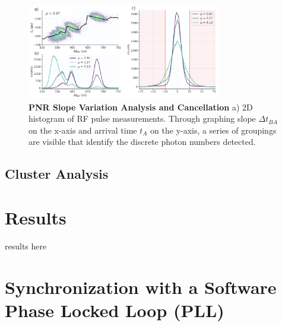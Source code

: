 \documentclass[11pt]{caltech_thesis} %
\begin{document}
\hypertarget{fig:slope-correction}{%
\begin{figure}
\centering
\includegraphics[width=0.75\textwidth,height=\textheight]{chapter_03/figs_03/slope_cancellation_light.pdf}
\caption[{PNR Slope Variation Analysis and Cancellation}]{\textbf{PNR
Slope Variation Analysis and Cancellation} a) 2D histogram of RF pulse
measurements. Through graphing slope \(\Delta t_{BA}\) on the x-axis and
arrival time \(t_A\) on the y-axis, a series of groupings are visible
that identify the discrete photon numbers detected.}
\label{fig:slope-correction}
\end{figure}
}

\hypertarget{cluster-analysis}{%
\subsection{Cluster Analysis}\label{cluster-analysis}}

\hypertarget{results-1}{%
\section{Results}\label{results-1}}

results here

\hypertarget{synchronization-with-a-software-phase-locked-loop-pll}{%
\section{Synchronization with a Software Phase Locked Loop
(PLL)}\label{synchronization-with-a-software-phase-locked-loop-pll}}
\end{document}
